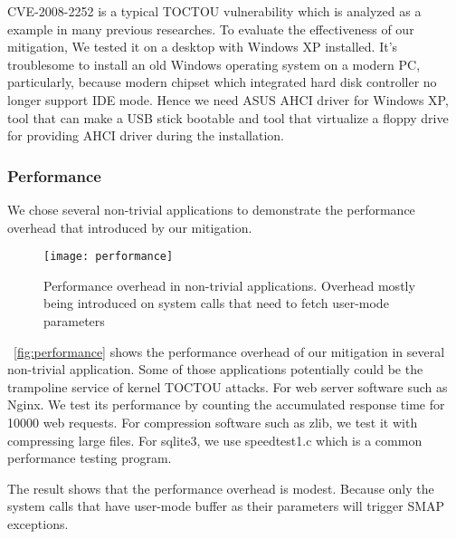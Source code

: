 CVE-2008-2252 is a typical TOCTOU vulnerability which is analyzed as a example in many previous researches. To evaluate the effectiveness of our mitigation, We tested it on a desktop with Windows XP installed. It's troublesome to install an old Windows operating system on a modern PC, particularly, because modern chipset which integrated hard disk controller no longer support IDE mode. Hence we need ASUS AHCI driver for Windows XP, tool that can make a USB stick bootable and tool that virtualize a floppy drive~\cite{installxpskylake} for providing AHCI driver during the installation.

\subsubsection{Performance}

We chose several non-trivial applications to demonstrate the performance overhead that introduced by our mitigation. 

\begin{figure}[th]
  \texttt{[image: performance]}
  \centering
  \caption{Performance overhead in non-trivial applications. Overhead mostly being introduced on system calls that need to fetch user-mode parameters}
  \label{fig:performance}
\end{figure}

~\autoref{fig:performance} shows the performance overhead of our mitigation in several non-trivial application. Some of those applications potentially could be the trampoline service of kernel TOCTOU attacks.
For web server software such as Nginx. We test its performance by counting the accumulated response time for 10000 web requests. For compression software such as zlib, we test it with compressing large files. For sqlite3, we use speedtest1.c which is a common performance testing program.

The result shows that the performance overhead is modest. Because only the system calls that have user-mode buffer as their parameters will trigger SMAP exceptions. 




